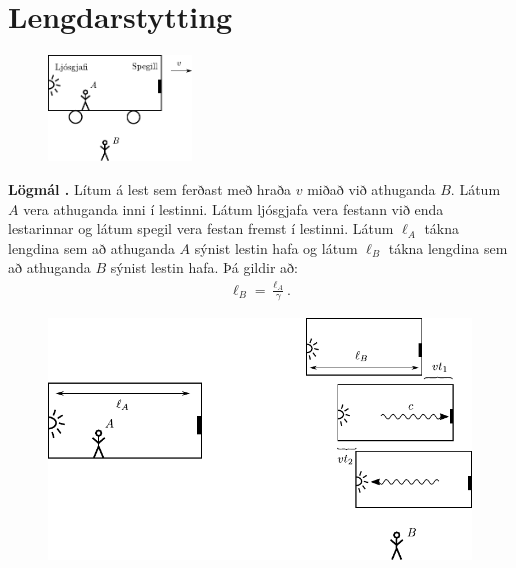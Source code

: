 \section{Lengdarstytting}

\setcounter{theorem}{8}

\begin{tcolorbox}
\begin{minipage}{\linewidth}

\begin{figure}
\vspace{-0.5cm}
\includegraphics[width = 1.5in]{figures/trains-einstein2.pdf}
\end{figure}
\textbf{Lögmál \thetheorem.} Lítum á lest sem ferðast með hraða $v$ miðað við athuganda $B$. Látum $A$ vera athuganda inni í lestinni. Látum ljósgjafa vera festann við enda lestarinnar og látum spegil vera festan fremst í lestinni. Látum $\ell_A$ tákna lengdina sem að athuganda $A$ sýnist lestin hafa og látum $\ell_B$ tákna lengdina sem að athuganda $B$ sýnist lestin hafa. Þá gildir að:
\begin{align*}
    \ell_B = \frac{\ell_A}{\gamma}.
\end{align*}
\end{minipage}
\end{tcolorbox}

\begin{figure}[H]
    \centering
    \includegraphics[scale = 0.7]{figures/trains-einstein2b.pdf}
\end{figure}

